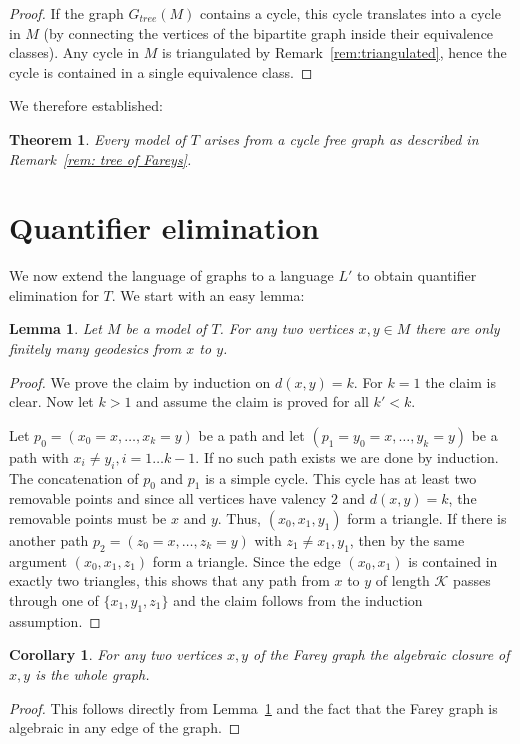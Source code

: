 \documentclass{amsart}
\newcommand{\K}{\mathcal{K}}
\newtheorem{theorem}[defi]{Theorem}
\newtheorem{lemma}[defi]{Lemma}
\newtheorem{corollary}[defi]{Corollary}
\begin{document}
\begin{proof}
    If the graph $G_{tree}(M)$ contains a cycle, this cycle translates into a cycle in $M$ (by connecting the vertices  of
    the bipartite graph inside their equivalence classes). Any cycle in $M$ is
    triangulated by Remark~\ref{rem:triangulated}, hence the cycle is contained in a single equivalence class.    
\end{proof}

We therefore established:
\begin{theorem}\label{thm:classification}
Every model of $T$ arises from a cycle free graph as described in Remark~\ref{rem: tree of Fareys}.
\end{theorem}

\section{Quantifier elimination}\label{sec:QE}

We now extend the language of graphs to a language $L'$ to obtain quantifier elimination for $T$.
We start with an easy lemma: 
\begin{lemma}\label{lem:finitely_many_path}
Let $M$ be a model of $T$.
    For  any two vertices $x, y\in M$ 
  there are only finitely many geodesics from $x$ to $y$.
\end{lemma}

\begin{proof}
    We prove the claim by induction on $d(x,y)=k$. For $k=1$ the claim is clear. Now let $k>1$ and assume the claim is proved for all
$k'<k$.

  Let $p_0=(x_0=x,\ldots, x_k=y)$ be a path and let $(p_1=y_0=x,\ldots,
y_k=y)$ be a path with $x_i\neq y_i, i=1\ldots k-1$. If no such path
exists we are done by induction.  The concatenation of $p_0$ and $p_1$
is a simple cycle. This cycle has at least two removable points and since
all vertices have valency $2$ and $d(x,y)=k$, the removable points must be
$x$ and $y$. Thus, $(x_0,x_1,y_1)$ form a triangle.
If there is another path $p_2=(z_0=x,\ldots, z_k=y)$ with $z_1\neq
x_1,y_1$, then by the same argument $(x_0,x_1,z_1)$ form a triangle.
Since the edge $(x_0,x_1)$ is contained in exactly two triangles, this
shows that any path from $x$ to $y$ of length $\K$ passes through one of
$\{x_1, y_1,z_1\}$ and the claim follows from the induction assumption.
\end{proof}

\begin{corollary}
        For any two vertices $x,y$ of the Farey graph the algebraic
        closure  of $x,y$ is the whole graph.
\end{corollary}
 \begin{proof}
     This follows directly from Lemma~\ref{lem:finitely_many_path} and the fact that the Farey graph is algebraic in any edge of the graph.
 \end{proof}
 
\end{document}
